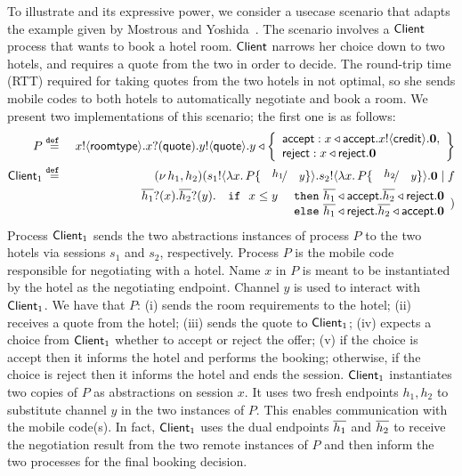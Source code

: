 \begin{example}\label{exam:proc}
To illustrate \HOp and its expressive power, 
we consider a usecase scenario that adapts the example given by Mostrous and Yoshida~\cite{MostrousY15}.
The scenario involves a $\mathsf{Client}$ process that wants to book
a hotel room. %
$\mathsf{Client}$
narrows  her choice down to two hotels, and requires 
 a quote from the two in order to
decide. The round-trip time (RTT) required for
taking quotes from the two hotels in not optimal, %
so she  sends mobile codes to both hotels
to automatically negotiate and book a room. 
We present two \HOp implementations of this scenario; the first one is  as follows:
%
	\begin{eqnarray*}%
		P &\defeq& \bout{x}{\rtype} \binp{x}{\Quote} \bout{y}{\Quote}
		y \triangleleft \left\{
				\begin{array}{l}
					\accept: \bsel{x}{\accept} \bout{x}{\creditc} \inact,\\
					\reject: \bsel{x}{\reject} \inact
				\end{array}
				\right\}
		\\ %
		\Client_1 &\defeq& \newsp{h_1, h_2}{\bout{s_1}{\abs{x}{P \subst{h_1}{y}}} \bout{s_2}{\abs{x}{P \subst{h_2}{y}}} \inact \Par f \\
		& & 
			\begin{array}{lll}
				\binp{\dual{h_1}}{x} \binp{\dual{h_2}}{y} & \If\ x \leq y\  & \Then \bsel{\dual{h_1}}{\accept} \bsel{\dual{h_2}}{\reject} \inact\\
				& & \Else \bsel{\dual{h_1}}{\reject} \bsel{\dual{h_2}}{\accept} \inact
			\end{array}
		}
	\end{eqnarray*}
%
Process $\mathsf{Client}_1$ sends the two abstractions instances of process $P$
		to the two hotels via sessions $s_1$ and $s_2$, respectively.
	Process $P$ is the mobile code responsible for negotiating with a hotel.
		Name $x$ in $P$ is meant to be instantiated by the hotel as the negotiating
		endpoint. Channel $y$ is used to interact with $\mathsf{Client}_1$.	
		We have that $P$: (i)  sends the room requirements to the hotel;
		(ii) receives a quote from the hotel;
		(iii) sends the quote to  $\mathsf{Client}_1$;
		(iv) expects a choice from   $\mathsf{Client}_1$ whether to accept or reject the offer;
		(v) if the choice is accept then it informs the hotel and performs the booking;
		otherwise, if the choice is reject then it informs the hotel and ends the session.
				$\mathsf{Client}_1$ instantiates two copies of  $P$ as abstractions
		on session $x$. It uses two
		fresh endpoints $h_1, h_2$ to substitute channel $y$
		in the two instances of $P$. This enables communication with the mobile code(s).
		In fact, 
		$\mathsf{Client}_1$ uses the dual endpoints $\overline{h_1}$ and $\overline{h_2}$
		to receive the negotiation
		result from the two remote instances of $P$ and then inform the two
		processes for the final booking decision.


\end{example}
